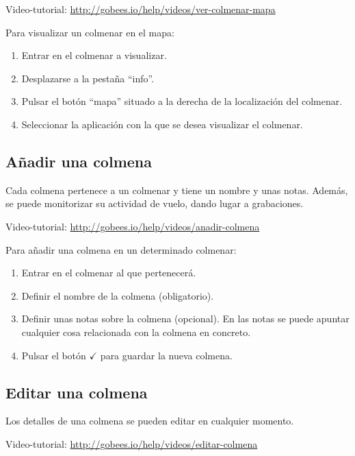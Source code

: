 Video-tutorial: \url{http://gobees.io/help/videos/ver-colmenar-mapa}

Para visualizar un colmenar en el mapa:

\begin{enumerate}
\def\labelenumi{\arabic{enumi}.}
\tightlist
\item
  Entrar en el colmenar a visualizar.
\item
  Desplazarse a la pestaña ``info''.
\item
  Pulsar el botón ``mapa'' situado a la derecha de la localización del
  colmenar.
\item
  Seleccionar la aplicación con la que se desea visualizar el colmenar.
\end{enumerate}

\subsection{Añadir una colmena}\label{auxf1adir-una-colmena}

Cada colmena pertenece a un colmenar y tiene un nombre y unas notas.
Además, se puede monitorizar su actividad de vuelo, dando lugar a
grabaciones.

Video-tutorial: \url{http://gobees.io/help/videos/anadir-colmena}

Para añadir una colmena en un determinado colmenar:

\begin{enumerate}
\def\labelenumi{\arabic{enumi}.}
\tightlist
\item
  Entrar en el colmenar al que pertenecerá.
\item
  Definir el nombre de la colmena (obligatorio).
\item
  Definir unas notas sobre la colmena (opcional). En las notas se puede
  apuntar cualquier cosa relacionada con la colmena en concreto.
\item
  Pulsar el botón {$\checkmark$} para guardar la nueva colmena.
\end{enumerate}

\subsection{Editar una colmena}\label{editar-una-colmena}

Los detalles de una colmena se pueden editar en cualquier momento.

Video-tutorial: \url{http://gobees.io/help/videos/editar-colmena}

